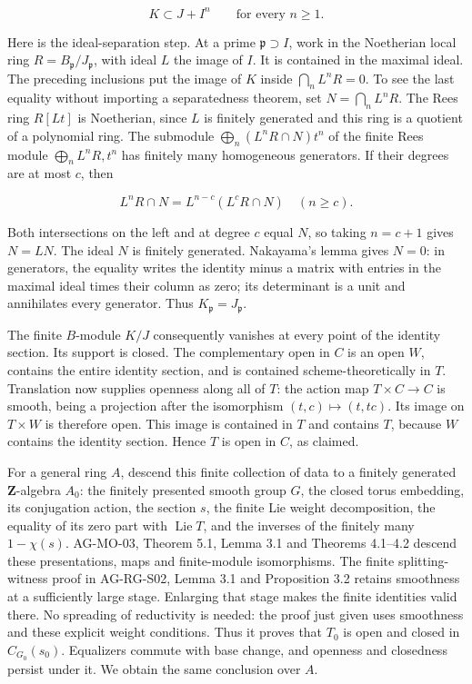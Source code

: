 \documentclass[11pt,a4paper,openany]{report}
\begin{document}
\[
K\subset J+I^n\qquad\text{for every }n\ge1.
\]

Here is the ideal-separation step. At a prime \(\mathfrak p\supset I\), work in the Noetherian local ring \(R=B_\mathfrak p/J_\mathfrak p\), with ideal \(L\) the image of \(I\). It is contained in the maximal ideal. The preceding inclusions put the image of \(K\) inside \(\bigcap_n L^nR=0\). To see the last equality without importing a separatedness theorem, set \(N=\bigcap_n L^nR\). The Rees ring \(R[Lt]\) is Noetherian, since \(L\) is finitely generated and this ring is a quotient of a polynomial ring. The submodule \(\bigoplus_n(L^nR\cap N)t^n\) of the finite Rees module \(\bigoplus_n L^nR,t^n\) has finitely many homogeneous generators. If their degrees are at most \(c\), then

\[
L^nR\cap N=L^{n-c}(L^cR\cap N)\quad(n\ge c).
\]

Both intersections on the left and at degree \(c\) equal \(N\), so taking \(n=c+1\) gives \(N=LN\). The ideal \(N\) is finitely generated. Nakayama's lemma gives \(N=0\): in generators, the equality writes the identity minus a matrix with entries in the maximal ideal times their column as zero; its determinant is a unit and annihilates every generator. Thus \(K_\mathfrak p=J_\mathfrak p\).

The finite \(B\)-module \(K/J\) consequently vanishes at every point of the identity section. Its support is closed. The complementary open in \(C\) is an open \(W\), contains the entire identity section, and is contained scheme-theoretically in \(T\). Translation now supplies openness along all of \(T\): the action map \(T\times C\to C\) is smooth, being a projection after the isomorphism \((t,c)\mapsto(t,tc)\). Its image on \(T\times W\) is therefore open. This image is contained in \(T\) and contains \(T\), because \(W\) contains the identity section. Hence \(T\) is open in \(C\), as claimed.

For a general ring \(A\), descend this finite collection of data to a finitely generated \(\mathbf Z\)-algebra \(A_0\): the finitely presented smooth group \(G\), the closed torus embedding, its conjugation action, the section \(s\), the finite Lie weight decomposition, the equality of its zero part with \(\operatorname{Lie}T\), and the inverses of the finitely many \(1-\chi(s)\). AG-MO-03, Theorem 5.1, Lemma 3.1 and Theorems 4.1--4.2 descend these presentations, maps and finite-module isomorphisms. The finite splitting-witness proof in AG-RG-S02, Lemma 3.1 and Proposition 3.2 retains smoothness at a sufficiently large stage. Enlarging that stage makes the finite identities valid there. No spreading of reductivity is needed: the proof just given uses smoothness and these explicit weight conditions. Thus it proves that \(T_0\) is open and closed in \(C_{G_0}(s_0)\). Equalizers commute with base change, and openness and closedness persist under it. We obtain the same conclusion over \(A\).
\end{document}
